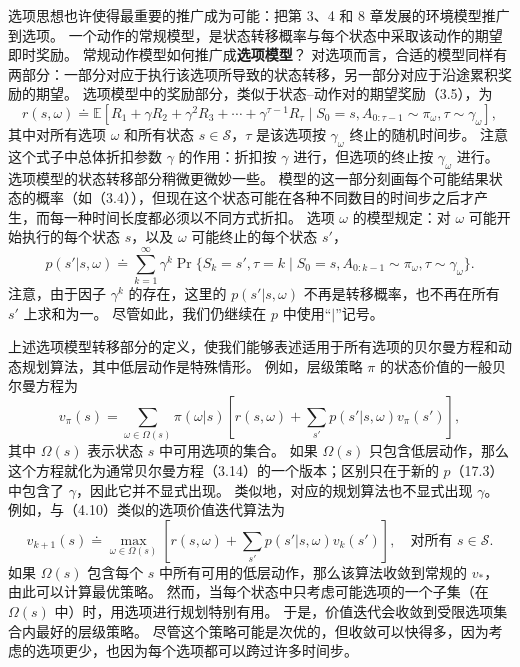\documentclass[UTF8, 12pt, fontset=fandol, oneside]{ctexart}
\begin{document}
选项思想也许使得最重要的推广成为可能：把第 3、4 和 8 章发展的环境模型推广到选项。
一个动作的常规模型，是状态转移概率与每个状态中采取该动作的期望即时奖励。
常规动作模型如何推广成\textbf{选项模型}？
对选项而言，合适的模型同样有两部分：一部分对应于执行该选项所导致的状态转移，另一部分对应于沿途累积奖励的期望。
选项模型中的奖励部分，类似于状态--动作对的期望奖励（3.5），为
\begin{equation}
r(s,\omega)\doteq
\mathbb{E}\left[
R_1+\gamma R_2+\gamma^2R_3+\cdots+\gamma^{\tau-1}R_\tau
\mid S_0=s,A_{0:\tau-1}\sim\pi_\omega,\tau\sim\gamma_\omega
\right],
\tag{17.2}
\end{equation}
其中对所有选项 $\omega$ 和所有状态 $s\in\mathcal{S}$，$\tau$ 是该选项按 $\gamma_\omega$ 终止的随机时间步。
注意这个式子中总体折扣参数 $\gamma$ 的作用：折扣按 $\gamma$ 进行，但选项的终止按 $\gamma_\omega$ 进行。
选项模型的状态转移部分稍微更微妙一些。
模型的这一部分刻画每个可能结果状态的概率（如（3.4）），但现在这个状态可能在各种不同数目的时间步之后才产生，而每一种时间长度都必须以不同方式折扣。
选项 $\omega$ 的模型规定：对 $\omega$ 可能开始执行的每个状态 $s$，以及 $\omega$ 可能终止的每个状态 $s'$，
\begin{equation}
p(s'|s,\omega)\doteq
\sum_{k=1}^{\infty}\gamma^k
\Pr\{S_k=s',\tau=k\mid S_0=s,A_{0:k-1}\sim\pi_\omega,\tau\sim\gamma_\omega\}.
\tag{17.3}
\end{equation}
注意，由于因子 $\gamma^k$ 的存在，这里的 $p(s'|s,\omega)$ 不再是转移概率，也不再在所有 $s'$ 上求和为一。
尽管如此，我们仍继续在 $p$ 中使用“$|$”记号。

上述选项模型转移部分的定义，使我们能够表述适用于所有选项的贝尔曼方程和动态规划算法，其中低层动作是特殊情形。
例如，层级策略 $\pi$ 的状态价值的一般贝尔曼方程为
\begin{equation}
v_\pi(s)=
\sum_{\omega\in\Omega(s)}\pi(\omega|s)
\left[
r(s,\omega)+\sum_{s'}p(s'|s,\omega)v_\pi(s')
\right],
\tag{17.4}
\end{equation}
其中 $\Omega(s)$ 表示状态 $s$ 中可用选项的集合。
如果 $\Omega(s)$ 只包含低层动作，那么这个方程就化为通常贝尔曼方程（3.14）的一个版本；区别只在于新的 $p$（17.3）中包含了 $\gamma$，因此它并不显式出现。
类似地，对应的规划算法也不显式出现 $\gamma$。
例如，与（4.10）类似的选项价值迭代算法为
\[
v_{k+1}(s)\doteq
\max_{\omega\in\Omega(s)}
\left[
r(s,\omega)+\sum_{s'}p(s'|s,\omega)v_k(s')
\right],
\quad \text{对所有 }s\in\mathcal{S}.
\]
如果 $\Omega(s)$ 包含每个 $s$ 中所有可用的低层动作，那么该算法收敛到常规的 $v_*$，由此可以计算最优策略。
然而，当每个状态中只考虑可能选项的一个子集（在 $\Omega(s)$ 中）时，用选项进行规划特别有用。
于是，价值迭代会收敛到受限选项集合内最好的层级策略。
尽管这个策略可能是次优的，但收敛可以快得多，因为考虑的选项更少，也因为每个选项都可以跨过许多时间步。
\end{document}
